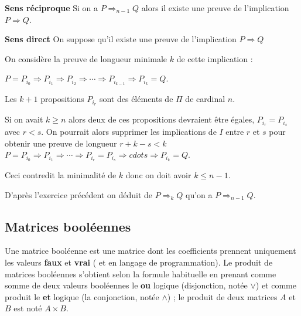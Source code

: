 \begin{Answer}

{\bf Sens réciproque} 
Si on a $P \Rightarrow_{n - 1} Q$ alors il existe une preuve de l'implication
$P \Rightarrow Q$.

{\bf Sens direct} On suppose qu'il existe une preuve de l'implication $P \Rightarrow Q$

On considère la preuve de longueur minimale $k$ de cette implication :

$P = P_{i_0} \Rightarrow P_{i_1} \Rightarrow P_{i_2} \Rightarrow \cdots \Rightarrow P_{i_{k-1}} \Rightarrow P_{i_k} = Q$.

Les $k+1$ propositions $P_{i_r}$ sont des éléments de $\Pi$ de cardinal $n$.

Si on avait $k\ge n$ alors deux de ces propositions devraient être égales, $P_{i_r} = P_{i_s}$ avec $r < s$. On pourrait alors supprimer les implications de $I$ entre $r$ et $s$ pour obtenir une preuve de longueur $r + k-s < k$
$P = P_{i_0} \Rightarrow P_{i_1} \Rightarrow  \cdots \Rightarrow P_{i_r} = P_{i_s} \Rightarrow cdots \Rightarrow P_{i_k} = Q$.

Ceci contredit la minimalité de $k$ donc on doit avoir $k \le n-1$.

D'après l'exercice précédent on déduit de $P \Rightarrow_k Q$ qu'on a $P \Rightarrow_{n - 1} Q$.
\end{Answer}
\subsection{Matrices booléennes}
Une matrice booléenne est une matrice dont les coefficients prennent uniquement les valeurs {\bf faux} et {\bf vrai} ( et  en langage de  programmation). Le produit de matrices booléennes s'obtient selon la formule habituelle en prenant comme somme de deux valeurs booléennes le {\bf ou} logique (disjonction, notée $\lor$) et comme produit le {\bf et} logique (la conjonction, notée $\land$) ; le 
produit de deux matrices $A$ et $B$ est noté $A \times B$. 

